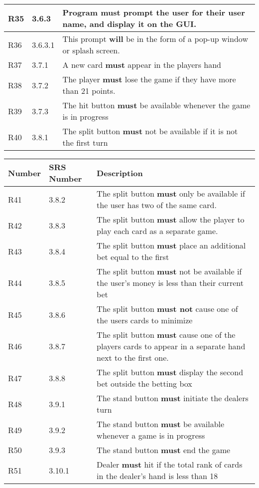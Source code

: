 \documentclass{article}
\begin{document}
\begin{tabular}{|l|l|p{5in}|}
R35 & 3.6.3 & Program \textbf{must} prompt the user for their user name, and display it on the GUI.   \\\hline
R36 & 3.6.3.1 & This prompt \textbf{will} be in the form of a pop-up window or splash screen. \\\hline
R37 & 3.7.1 & A new card \textbf{must} appear in the players hand \\\hline
R38 & 3.7.2 &  The player \textbf{must} lose the game if they have more than 21 points. \\\hline
R39 & 3.7.3 & The hit button \textbf{must} be available whenever the game is in progress \\\hline
R40 & 3.8.1 & The split button \textbf{must} not be available if it is not the first turn \\\hline
\end{tabular}\newpage\begin{tabular}{|l|l|p{5in}|}\hline Number & SRS Number & Description\\\hline\hline
R41 & 3.8.2 & The split button \textbf{must} only be available if the user has two of the same card. \\\hline
R42 & 3.8.3 & The split button \textbf{must} allow the player to play each card as a separate game. \\\hline
R43 & 3.8.4 & The split button \textbf{must} place an additional bet equal to the first \\\hline
R44 & 3.8.5 & The split button \textbf{must} not be available if the user’s money is less than their current bet \\\hline
R45 & 3.8.6 & The split button \textbf{must not} cause one of the users cards to minimize \\\hline
R46 & 3.8.7 & The split button \textbf{must} cause one of the players cards to appear in a separate hand next to the first one. \\\hline
R47 & 3.8.8 & The split button \textbf{must} display the second bet outside the betting box \\\hline
R48 & 3.9.1 & The stand button \textbf{must} initiate the dealers turn \\\hline
R49 & 3.9.2 & The stand button \textbf{must} be available whenever a game is in progress \\\hline
R50 & 3.9.3 &  The stand button \textbf{must} end the game \\\hline
R51 & 3.10.1 & Dealer \textbf{must} hit if the total rank of cards in the dealer's hand is less than 18 \\\hline

\end{tabular}
\end{document}
